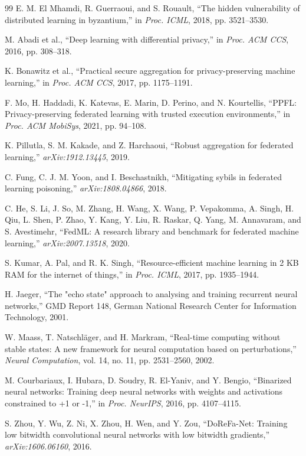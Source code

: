 \documentclass[conference,10pt]{IEEEtran}
\begin{document}
\begin{thebibliography}{99}
E. M. El Mhamdi, R. Guerraoui, and S. Rouault, ``The hidden vulnerability of distributed learning in byzantium,'' in \textit{Proc. ICML}, 2018, pp. 3521--3530.

M. Abadi et al., ``Deep learning with differential privacy,'' in \textit{Proc. ACM CCS}, 2016, pp. 308--318.

K. Bonawitz et al., ``Practical secure aggregation for privacy-preserving machine learning,'' in \textit{Proc. ACM CCS}, 2017, pp. 1175--1191.

F. Mo, H. Haddadi, K. Katevas, E. Marin, D. Perino, and N. Kourtellis, ``PPFL: Privacy-preserving federated learning with trusted execution environments,'' in \textit{Proc. ACM MobiSys}, 2021, pp. 94--108.

K. Pillutla, S. M. Kakade, and Z. Harchaoui, ``Robust aggregation for federated learning,'' \textit{arXiv:1912.13445}, 2019.

C. Fung, C. J. M. Yoon, and I. Beschastnikh, ``Mitigating sybils in federated learning poisoning,'' \textit{arXiv:1808.04866}, 2018.

C. He, S. Li, J. So, M. Zhang, H. Wang, X. Wang, P. Vepakomma, A. Singh, H. Qiu, L. Shen, P. Zhao, Y. Kang, Y. Liu, R. Raskar, Q. Yang, M. Annavaram, and S. Avestimehr, ``FedML: A research library and benchmark for federated machine learning,'' \textit{arXiv:2007.13518}, 2020.

S. Kumar, A. Pal, and R. K. Singh, ``Resource-efficient machine learning in 2 KB RAM for the internet of things,'' in \textit{Proc. ICML}, 2017, pp. 1935--1944.

H. Jaeger, ``The "echo state" approach to analysing and training recurrent neural networks,'' GMD Report 148, German National Research Center for Information Technology, 2001.

W. Maass, T. Natschläger, and H. Markram, ``Real-time computing without stable states: A new framework for neural computation based on perturbations,'' \textit{Neural Computation}, vol. 14, no. 11, pp. 2531--2560, 2002.

M. Courbariaux, I. Hubara, D. Soudry, R. El-Yaniv, and Y. Bengio, ``Binarized neural networks: Training deep neural networks with weights and activations constrained to +1 or -1,'' in \textit{Proc. NeurIPS}, 2016, pp. 4107--4115.

S. Zhou, Y. Wu, Z. Ni, X. Zhou, H. Wen, and Y. Zou, ``DoReFa-Net: Training low bitwidth convolutional neural networks with low bitwidth gradients,'' \textit{arXiv:1606.06160}, 2016.

\end{thebibliography}
\end{document}
